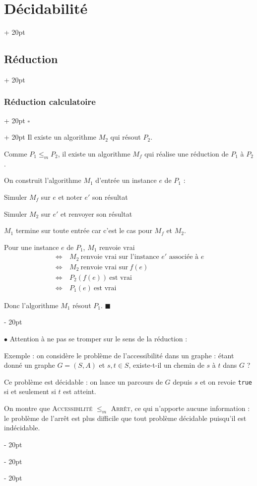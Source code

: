 \documentclass[a4paper, 12pt, twoside]{article}
\newenvironment{indalgo}[2][H]{
    \begin{algoBox}
        \begin{algorithm}[#1]
            \caption{#2}
}
{
        \end{algorithm}
    \end{algoBox}
}
\newcommand{\ssi}{\ \Leftrightarrow \ }
\renewcommand{\le}{\leqslant}
\newcommand{\ind}[1][20pt]{\advance\leftskip + #1}
\newcommand{\deind}[1][20pt]{\advance\leftskip - #1}
\newenvironment{indt}[2][20pt]{#2 \par \ind[#1]}{\par \deind} %
\newenvironment{proof}[1][{}]{\begin{indt}{$\square$ #1}}{$\blacksquare$ \end{indt}}
\begin{document}
\begin{indt}{\section{Décidabilité}}
\begin{indt}{\subsection{Réduction}}
\begin{indt}{\subsubsection{Réduction calculatoire}}
\begin{proof}
                    Il existe un algorithme $M_2$ qui résout $P_2$.

                    Comme $P_1 \le_m P_2$, il existe un algorithme $M_f$ qui réalise une réduction de $P_1$ à $P_2$.

                    On construit l'algorithme $M_1$ d'entrée un instance $e$ de $P_1$ :

                    \begin{indalgo}{$M_1$}
                        Simuler $M_f$ sur $e$ et noter $e'$ son résultat\;

                        Simuler $M_2$ sur $e'$ et renvoyer son résultat\;
                    \end{indalgo}

                    $M_1$ termine sur toute entrée car c'est le cas pour $M_f$ et $M_2$.

                    Pour une instance $e$ de $P_1$, $M_1$ renvoie vrai
                    \[
                        \begin{array}{cl}
                            \ssi & M_2\ \text{renvoie vrai sur l'instance $e'$ associée à $e$}
                            \\
                            \ssi & M_2\ \text{renvoie vrai sur}\ f(e)
                            \\
                            \ssi & P_2(f(e)) \ \text{est vrai}
                            \\
                            \ssi & P_1(e) \ \text{est vrai}
                        \end{array}
                    \]

                    Donc l'algorithme $M_1$ résout $P_1$.
                \end{proof}

                \vspace{12pt}
                
                $\bullet$ Attention à ne pas se tromper sur le sens de la réduction : 

                Exemple : on considère le problème de l'accessibilité dans un graphe : étant donné un graphe $G = (S, A)$ et $s, t \in S$, existe-t-il un chemin de $s$ à $t$ dans $G$ ?

                Ce problème est décidable : on lance un parcours de $G$ depuis $s$ et on revoie \texttt{true} si et seulement si $t$ est atteint.

                On montre que \textsc{Accessibilité} $\le_m$ \textsc{Arrêt}, ce qui n'apporte aucune information : le problème de l'arrêt est plus difficile que tout problème décidable puisqu'il est indécidable.


\end{indt}
\end{indt}
\end{indt}
\end{document}
